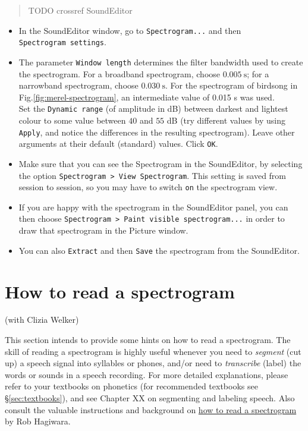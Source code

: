 \documentclass[
]{book}
\begin{document}
\begin{quote}
TODO crossref SoundEditor
\end{quote}

\begin{itemize}
\item
  In the SoundEditor window, go to \texttt{Spectrogram...} and then \texttt{Spectrogram\ settings}.
\item
  The parameter \texttt{Window\ length} determines the filter bandwidth used to create the spectrogram. For a broadband spectrogram, choose \(0.005\ \textrm{s}\); for a narrowband spectrogram, choose \(0.030\ \textrm{s}\).
  For the spectrogram of birdsong in Fig.\ref{fig:merel-spectrogram}, an intermediate value of 0.015 s was used.\\
  Set the \texttt{Dynamic\ range} (of amplitude in dB) between darkest and lightest colour to some value between \(40\) and \(55\) dB (try different values by using \texttt{Apply}, and notice the differences in the resulting spectrogram).
  Leave other arguments at their default (standard) values. Click \texttt{OK}.
\item
  Make sure that you can see the Spectrogram in the SoundEditor, by selecting the option \texttt{Spectrogram\ \textgreater{}\ View\ Spectrogram}. This setting is saved from session to session, so you may have to switch \texttt{on} the spectrogram view.
\item
  If you are happy with the spectrogram in the SoundEditor panel, you can then choose \texttt{Spectrogram\ \textgreater{}\ Paint\ visible\ spectrogram...} in order to draw that spectrogram in the Picture window.
\item
  You can also \texttt{Extract} and then \texttt{Save} the spectrogram from the SoundEditor.
\end{itemize}

\section{How to read a spectrogram}\label{how-to-read-a-spectrogram}

(with Clizia Welker)

\label{box-spectrogram}
This section intends to provide some hints on how to read a spectrogram. The skill of reading a spectrogram is highly useful whenever you need to \emph{segment} (cut up) a speech signal into syllables or phones, and/or need to \emph{transcribe} (label) the words or sounds in a speech recording. For more detailed explanations, please refer to your textbooks on phonetics (for recommended textbooks see §\ref{sec:textbooks}), and see Chapter XX on segmenting and labeling speech. Also consult the valuable instructions and background on \href{https://home.cc.umanitoba.ca/~robh/howto.html}{how to read a spectrogram} by Rob Hagiwara.
\end{document}
